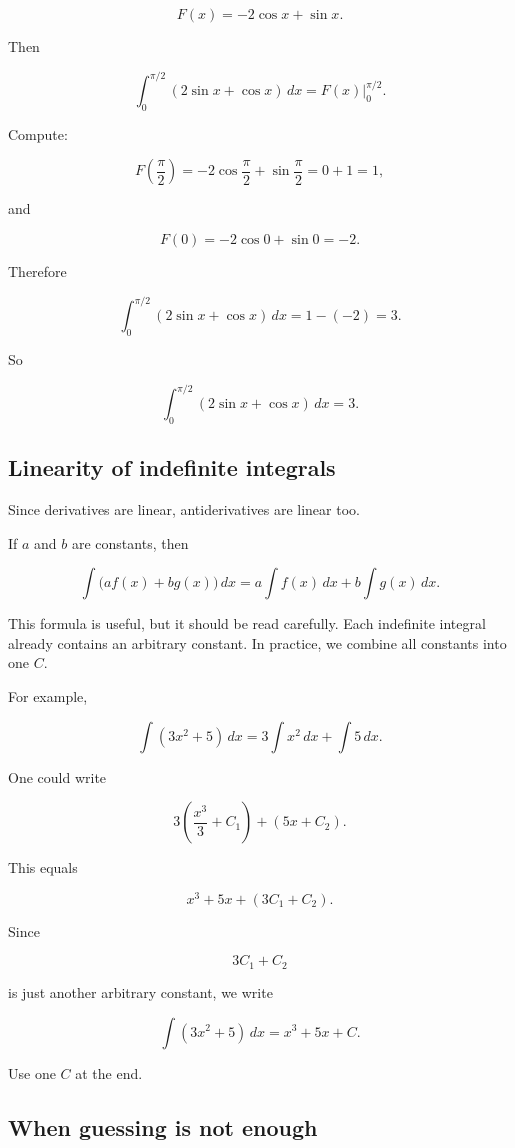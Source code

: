 \[
F(x)=-2\cos x+\sin x.
\]

Then

\[
\int_0^{\pi/2} (2\sin x+\cos x)\,dx
=
F(x)\Big|_0^{\pi/2}.
\]

Compute:

\[
F\left(\frac{\pi}{2}\right)
=
-2\cos\frac{\pi}{2}+\sin\frac{\pi}{2}
=
0+1=1,
\]

and

\[
F(0)=-2\cos0+\sin0=-2.
\]

Therefore

\[
\int_0^{\pi/2} (2\sin x+\cos x)\,dx
=
1-(-2)=3.
\]

So

\[
\boxed{
\int_0^{\pi/2} (2\sin x+\cos x)\,dx=3.
}
\]

\subsection{Linearity of indefinite integrals}
\label{subsec:linearity-indefinite-integrals}

Since derivatives are linear, antiderivatives are linear too.

If \(a\) and \(b\) are constants, then

\[
\boxed{
\int \bigl(a f(x)+b g(x)\bigr)\,dx
=
a\int f(x)\,dx+b\int g(x)\,dx.
}
\]

This formula is useful, but it should be read carefully.  Each indefinite integral already
contains an arbitrary constant.  In practice, we combine all constants into one \(C\).

For example,

\[
\int (3x^2+5)\,dx
=
3\int x^2\,dx+\int 5\,dx.
\]

One could write

\[
3\left(\frac{x^3}{3}+C_1\right)+(5x+C_2).
\]

This equals

\[
x^3+5x+(3C_1+C_2).
\]

Since

\[
3C_1+C_2
\]

is just another arbitrary constant, we write

\[
\boxed{
\int (3x^2+5)\,dx=x^3+5x+C.
}
\]

Use one \(C\) at the end.

\subsection{When guessing is not enough}
\label{subsec:when-guessing-antiderivatives-not-enough}

